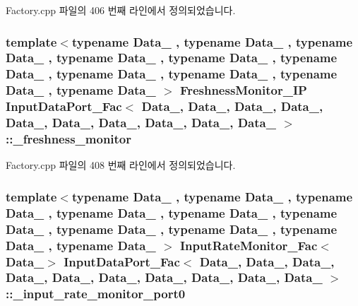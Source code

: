 Factory.\+cpp 파일의 406 번째 라인에서 정의되었습니다.

\subsubsection[{\texorpdfstring{\+\_\+freshness\+\_\+monitor}{_freshness_monitor}}]{\setlength{\rightskip}{0pt plus 5cm}template$<$typename Data\+\_ , typename Data\+\_ , typename Data\+\_ , typename Data\+\_ , typename Data\+\_ , typename Data\+\_ , typename Data\+\_ , typename Data\+\_ , typename Data\+\_ , typename Data\+\_ $>$ {\bf Freshness\+Monitor\+\_\+\+IP} {\bf Input\+Data\+Port\+\_\+\+Fac}$<$ Data\+\_, Data\+\_, Data\+\_, Data\+\_, Data\+\_, Data\+\_, Data\+\_, Data\+\_, Data\+\_, Data\+\_ $>$\+::\+\_\+freshness\+\_\+monitor\hspace{0.3cm}{\ttfamily [private]}}\hypertarget{classInputDataPort__Fac_ae9458e7627cc26884a106de9d091d399}{}\label{classInputDataPort__Fac_ae9458e7627cc26884a106de9d091d399}


Factory.\+cpp 파일의 408 번째 라인에서 정의되었습니다.

\subsubsection[{\texorpdfstring{\+\_\+input\+\_\+rate\+\_\+monitor\+\_\+port0}{_input_rate_monitor_port0}}]{\setlength{\rightskip}{0pt plus 5cm}template$<$typename Data\+\_ , typename Data\+\_ , typename Data\+\_ , typename Data\+\_ , typename Data\+\_ , typename Data\+\_ , typename Data\+\_ , typename Data\+\_ , typename Data\+\_ , typename Data\+\_ $>$ {\bf Input\+Rate\+Monitor\+\_\+\+Fac}$<$Data\+\_$>$ {\bf Input\+Data\+Port\+\_\+\+Fac}$<$ Data\+\_, Data\+\_, Data\+\_, Data\+\_, Data\+\_, Data\+\_, Data\+\_, Data\+\_, Data\+\_, Data\+\_ $>$\+::\+\_\+input\+\_\+rate\+\_\+monitor\+\_\+port0\hspace{0.3cm}{\ttfamily [private]}}\hypertarget{classInputDataPort__Fac_a91153b4dfaf9af79df3223ec7f17eab2}{}\label{classInputDataPort__Fac_a91153b4dfaf9af79df3223ec7f17eab2}


